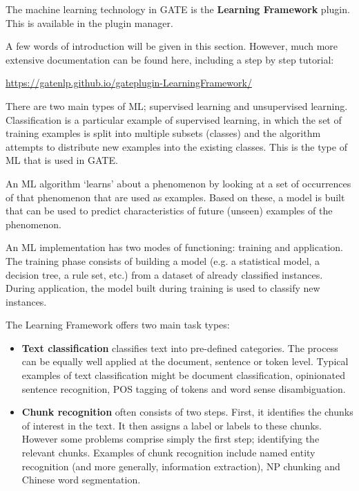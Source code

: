 

The machine learning technology in GATE is the \textbf{Learning
Framework} plugin. This is available in the plugin manager.

A few words of introduction will be given in this section. However,
much more extensive documentation can be found here, including a step
by step tutorial:

\url{https://gatenlp.github.io/gateplugin-LearningFramework/}


There are two main types of ML; supervised learning and unsupervised
learning. Classification is a particular example of supervised
learning, in which the set of training examples is split into multiple
subsets (classes) and the algorithm attempts to distribute new
examples into the existing classes. This is the type of ML that is
used in GATE.

An ML algorithm `learns' about a phenomenon by looking at a set of occurrences
of that phenomenon that are used as examples. Based on these, a model is built
that can be used to predict characteristics of future (unseen) examples of the
phenomenon.

An ML implementation has two modes of functioning: training and application.  The
training phase consists of building a model (e.g. a statistical model, a decision
tree, a rule set, etc.) from a dataset of already classified instances.  During
application, the model built during training is used to classify new instances.

The Learning Framework offers two main task types:

\begin{itemize}
  
\item {\bf Text classification}
classifies text into pre-defined categories. The process can be
equally well applied at the document, sentence or token level. Typical
examples of text classification might be document classification,
opinionated sentence recognition, POS tagging of tokens and word sense
disambiguation.

\item {\bf Chunk recognition} often consists of two steps. First, it identifies
the chunks of interest in the text. It then assigns a label or labels to these
chunks. However some problems comprise simply the first step; identifying the
relevant chunks. Examples of chunk recognition include named entity recognition
(and more generally, information extraction), NP chunking and Chinese word
segmentation.

\end{itemize}

